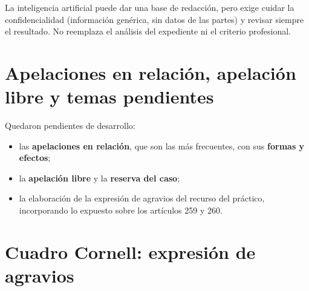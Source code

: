 \documentclass[12pt,oneside]{book}
\begin{document}
\begin{important}
La inteligencia artificial puede dar una base de redacción, pero exige cuidar la confidencialidad (información genérica, sin datos de las partes) y revisar siempre el resultado. No reemplaza el análisis del expediente ni el criterio profesional.
\end{important}

\section{Apelaciones en relación, apelación libre y temas pendientes}

Quedaron pendientes de desarrollo:

\begin{itemize}
    \item las \textbf{apelaciones en relación}, que son las más frecuentes, con sus \textbf{formas y efectos};
    \item la \textbf{apelación libre} y la \textbf{reserva del caso};
    \item la elaboración de la expresión de agravios del recurso del práctico, incorporando lo expuesto sobre los artículos 259 y 260.
\end{itemize}

\section*{Cuadro Cornell: expresión de agravios}
\end{document}
